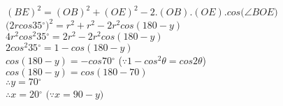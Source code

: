 \documentclass[journal,12pt,twocolumn]{IEEEtran}
\renewcommand\thesection{\arabic{section}}
\begin{document}
\begin{enumerate}[label=\thesection.\arabic*.,ref=\thesection.\theenumi]
               $(BE)^2=(OB)^2+(OE)^2-2$.$(OB)$.$(OE)$.$cos($$\angle$$BOE)$\\ 
                $(2rcos 35$$^{\circ}$$)^2 = r^2+r^2 - 2r^2cos(180-y)$\\ 
                $4r^2cos^2 35$$^{\circ}$$=2r^2 - 2r^2cos(180-y)$\\ 
                $2cos^2 35$$^{\circ}$$=1-cos(180-y)$\\ 
                $cos(180-y)=-cos 70$$^{\circ}$       (${\because}$$1-cos^2$${\theta}$$=cos 2$${\theta}$)\\ 
               $cos(180-y)=cos(180-70)$\\ 
                ${\therefore}$$y=70$$^{\circ}$\\ 
               ${\therefore}$$x=20$$^{\circ}$             $($${\because}$$x=90-y)$\\  
               
               
\end{enumerate}
\end{document}
